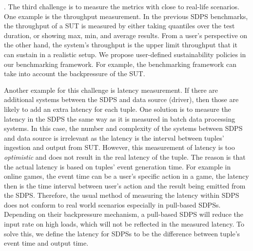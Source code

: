 .
The third challenge is to measure the metrics with close to real-life scenarios. %
One example  is the throughput measurement. In the previous SDPS benchmarks, the throughput of a SUT is measured by either taking quantiles over the test duration, or showing max, min, and average results. 
From a user's perspective on the other hand, the system's throughput is the upper limit throughput that it can sustain in a realistic setup. 
We propose user-defined sustainability policies in our benchmarking framework. For example, the benchmarking framework can take into account the backpressure of  the SUT.  %



Another example for this challenge is latency measurement. If there are additional systems between the SDPS and data source (driver), then those are likely to add an extra latency for each tuple.  One solution is  to measure the latency in the SDPS the same way as it is measured in batch data processing systems. In this case, the number and complexity of the systems between SDPS and data source is irrelevant as the latency is the interval between tuples' ingestion and output from SUT. However, this measurement of latency is too \textit{optimistic} and does not result in the real latency of the tuple. The reason is that  the actual latency is based on tuples' event generation time. For example in online games, the event time can be a user's specific action in a game, the latency then is the time interval between user's action and the result being emitted from the SDPS. Therefore, the usual method of measuring the latency within SDPS does not conform to real world scenarios especially in pull-based SDPSs. Depending on their backpressure mechanism, a pull-based SDPS will reduce the input rate on high loads, which will not be reflected in the measured latency. To solve this, we define the latency for SDPSs to be the difference between tuple's event time and output time. 

